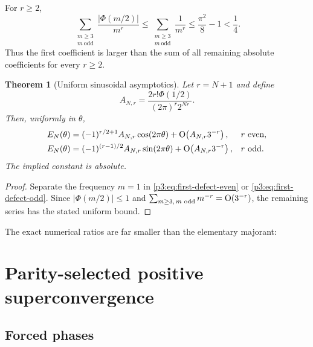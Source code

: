 \documentclass[11pt,oneside]{article}
\numberwithin{equation}{section}
\newtheorem{theorem}{Theorem}[section]
\theoremstyle{definition}
\theoremstyle{remark}
\newcommand{\abs}[1]{\left|#1\right|}
\begin{document}
For $r\ge2$,
\begin{equation}
 \sum_{\substack{m\ge3\\m\ \mathrm{odd}}}
 \frac{\abs{\Phi(m/2)}}{m^r}
 \le\sum_{\substack{m\ge3\\m\ \mathrm{odd}}}\frac1{m^r}
 \le\frac{\pi^2}{8}-1<\frac14.
 \label{p3:eq:harmonic-tail-bound}
\end{equation}
Thus the first coefficient is larger than the sum of all remaining absolute coefficients for every $r\ge2$.

\begin{theorem}[Uniform sinusoidal asymptotics]
\label{p3:thm:sinusoidal-asymptotics}
Let $r=N+1$ and define
\begin{equation}
 A_{N,r}=\frac{2r!\Phi(1/2)}{(2\pi)^r2^{Nr}}.
 \label{p3:eq:first-harmonic-amplitude}
\end{equation}
Then, uniformly in $\theta$,
\begin{align}
 E_N(\theta)
 &=(-1)^{r/2+1}A_{N,r}\cos(2\pi\theta)
 +\mathrm O\!\left(A_{N,r}3^{-r}\right),&&r\ \text{even},
 \label{p3:eq:cos-asymptotic}\\
 E_N(\theta)
 &=(-1)^{(r-1)/2}A_{N,r}\sin(2\pi\theta)
 +\mathrm O\!\left(A_{N,r}3^{-r}\right),&&r\ \text{odd}.
 \label{p3:eq:sin-asymptotic}
\end{align}
The implied constant is absolute.
\end{theorem}

\begin{proof}
Separate the frequency $m=1$ in \eqref{p3:eq:first-defect-even} or \eqref{p3:eq:first-defect-odd}.  Since $\abs{\Phi(m/2)}\le1$ and
$\sum_{m\ge3,\,m\text{ odd}}m^{-r}=\mathrm O(3^{-r})$, the remaining series has the stated uniform bound.
\end{proof}

The exact numerical ratios are far smaller than the elementary majorant:
\begin{table}[H]
\centering
\caption{Absolute spectral tail divided by the first harmonic.}
\label{p3:tab:harmonic-tail}

\end{table}

\section{Parity-selected positive superconvergence}
\label{p3:sec:superconvergence}

\subsection{Forced phases}
\end{document}
